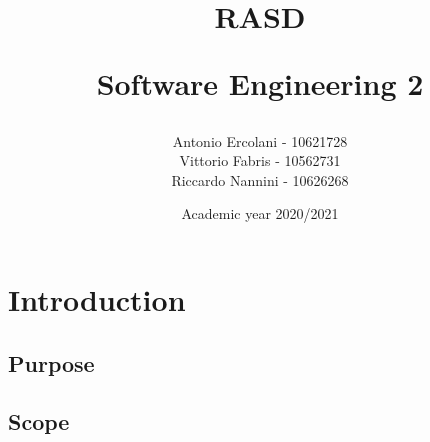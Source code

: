 \documentclass[]{article}
\title{ RASD \\
	\begin{large} 
		Software Engineering 2
	\end{large}}
\author{Antonio Ercolani - 10621728\\Vittorio Fabris - 10562731\\Riccardo Nannini - 10626268}
\date{Academic year 2020/2021}
\begin{document}
	
	\maketitle
	\begin{paragraph}
		\newline
	\end{paragraph}

	\newpage

	
	\tableofcontents
	
	\newpage
	
	
	\section{Introduction}
	
	\subsection{Purpose}
	
	\subsection{Scope}
	
	 
\end{document}
